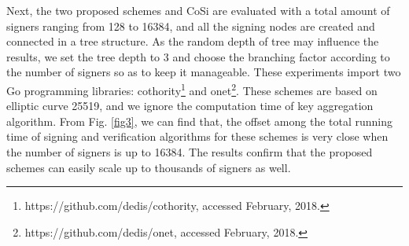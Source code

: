 \documentclass[journal]{IEEEtran}
\begin{document}
Next, the two proposed schemes and CoSi are evaluated with a total amount of signers ranging from 128 to 16384, and all the signing nodes are created and connected in a tree structure. As the random depth of tree may influence the results, we set the tree depth to 3 and choose the branching factor according to the number of signers so as to keep it manageable. These experiments import two Go programming libraries: cothority\footnote[4]{https://github.com/dedis/cothority, accessed February, 2018.} and onet\footnote[5]{https://github.com/dedis/onet, accessed February, 2018.}. These schemes are based on elliptic curve 25519, and we ignore the computation time of key aggregation algorithm. From Fig. \ref{fig3}, we can find that, the offset among the total running time of signing and verification algorithms for these schemes is very close when the number of signers is up to 16384. The results confirm that the proposed schemes can easily scale up to thousands of signers as well.
\end{document}

